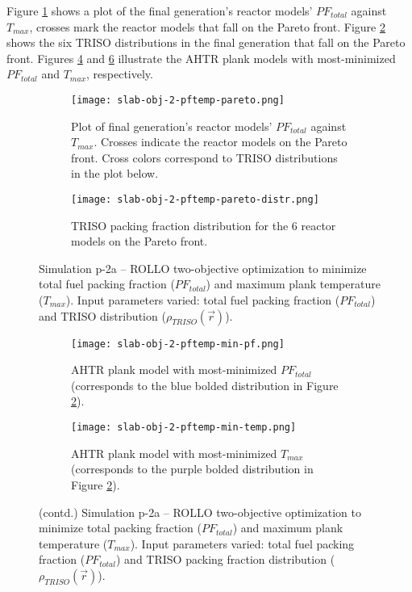 Figure \ref{fig:slab-obj-2-pftemp-pareto} shows a plot of the final generation's reactor 
models' $PF_{total}$ against $T_{max}$, crosses mark the reactor models that 
fall on the Pareto front.
Figure \ref{fig:slab-obj-2-pftemp-pareto-distr} shows the six TRISO distributions in 
the final generation that fall on the Pareto front.
Figures \ref{fig:slab-obj-2-pftemp-min-pf} and \ref{fig:slab-obj-2-pftemp-min-temp} 
illustrate the \gls{AHTR} plank models with most-minimized $PF_{total}$ and 
$T_{max}$, respectively.  
\begin{figure}[htbp!]
    \centering
    \begin{subfigure}{\textwidth}
        \texttt{[image: slab-obj-2-pftemp-pareto.png]}
        \caption{Plot of final generation's reactor models' $PF_{total}$ against 
        $T_{max}$. Crosses indicate the reactor models on the Pareto front. 
        Cross colors correspond to TRISO distributions in the plot below.}
        \label{fig:slab-obj-2-pftemp-pareto} 
    \end{subfigure}
    \begin{subfigure}{\textwidth}
        \texttt{[image: slab-obj-2-pftemp-pareto-distr.png]}
        \caption{TRISO packing fraction distribution for the 6 reactor models on the 
        Pareto front.}
        \label{fig:slab-obj-2-pftemp-pareto-distr} 
    \end{subfigure}
    \caption{Simulation p-2a -- ROLLO two-objective optimization to minimize total 
    fuel packing fraction ($PF_{total}$) and maximum plank temperature ($T_{max}$). 
    Input parameters varied: total fuel packing fraction ($PF_{total}$) and 
    \gls{TRISO} distribution ($\rho_{TRISO}(\vec{r})$).}
    \label{fig:slab-obj-2-pftemp}
\end{figure}
\begin{figure}[htbp!]
    \ContinuedFloat
    \begin{subfigure}{\textwidth}
        \texttt{[image: slab-obj-2-pftemp-min-pf.png]}
        \caption{\gls{AHTR} plank model with most-minimized $PF_{total}$
        (corresponds to the blue bolded distribution in Figure 
        \ref{fig:slab-obj-2-pftemp-pareto-distr}).}
        \label{fig:slab-obj-2-pftemp-min-pf} 
    \end{subfigure}
    \begin{subfigure}{\textwidth}
        \texttt{[image: slab-obj-2-pftemp-min-temp.png]}
        \caption{\gls{AHTR} plank model with most-minimized $T_{max}$
        (corresponds to the purple bolded distribution in Figure 
        \ref{fig:slab-obj-2-pftemp-pareto-distr}).}
        \label{fig:slab-obj-2-pftemp-min-temp} 
    \end{subfigure}
    \caption{(contd.) Simulation p-2a -- ROLLO two-objective optimization to minimize 
    total packing fraction ($PF_{total}$) and maximum plank temperature ($T_{max}$). 
    Input parameters varied: total fuel packing fraction ($PF_{total}$) and 
    \gls{TRISO} packing fraction distribution ($\rho_{TRISO}(\vec{r})$).}
\end{figure}


